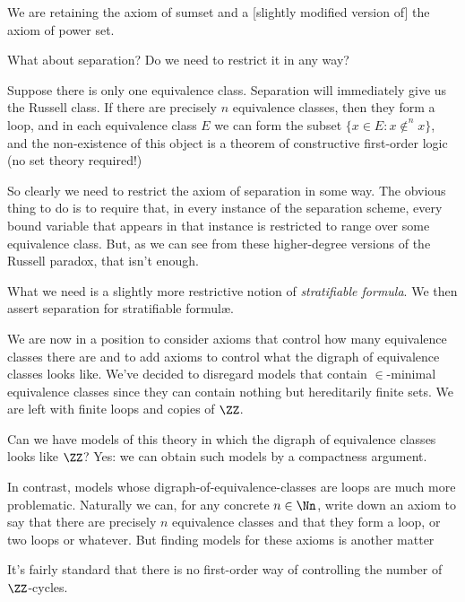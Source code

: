 \documentclass[12pt]{article}
\begin{document}
{We are retaining the axiom of sumset and a [slightly modified version
  of] the axiom of power set.

\bigskip


What about separation?   Do we need to restrict it in any way?


Suppose there is only one equivalence class.   Separation will immediately 
give us the Russell class.  If there are precisely $n$ equivalence classes, 
then they form a loop, and in each equivalence class $E$ we can form the 
subset $\{x \in E: x \not\in^n x\}$, and the non-existence of this object 
is a theorem of constructive first-order logic (no set theory required!)

So clearly we need to restrict the axiom of separation in some way.
The obvious thing to do is to require that, in every instance of the
separation scheme, every bound variable that appears in that instance is 
restricted to range over some equivalence class.   But, as we can see 
from these higher-degree versions of the Russell paradox, that isn't enough.

What we need is a slightly more restrictive notion of {\sl
  stratifiable formula}.  We then assert separation for stratifiable
formul{\ae}.

\smallskip

We are now in a position to consider axioms that control how many
equivalence classes there are and to add axioms to control what the
digraph of equivalence classes looks like.  We've decided to disregard
models that contain $\in$-minimal equivalence classes since they can contain
nothing but hereditarily finite sets.  We are left with finite loops and
copies of $\ZZ$.


Can we have models of this theory in which the digraph of equivalence
classes looks like $\ZZ$?  Yes: we can obtain such models by a
compactness argument.

In contrast, models whose digraph-of-equivalence-classes are loops are
much more problematic.  Naturally we can, for any concrete $n \in\Nn$,
write down an axiom to say that there are precisely $n$ equivalence
classes and that they form a loop, or two loops or whatever.  But
finding models for these axioms is another matter

  It's fairly standard that there is no first-order way of controlling
  the number of $\ZZ$-cycles.


  

}
\end{document}
